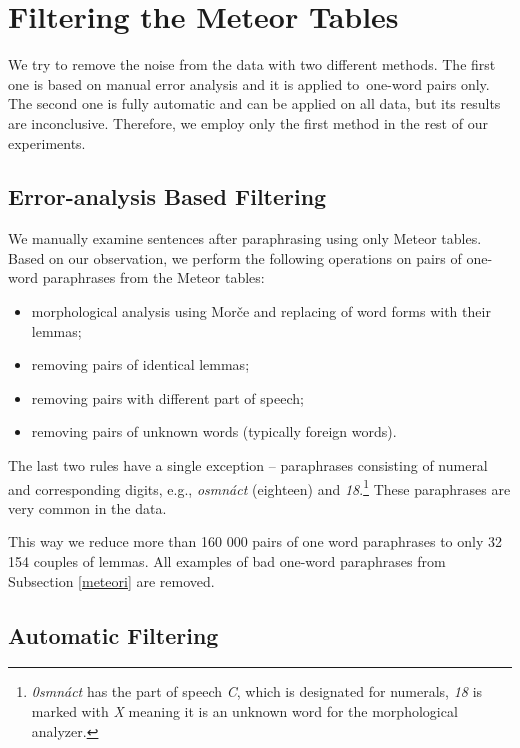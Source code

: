 \section{Filtering the Meteor Tables}
\label{filtering-section}

We try to remove the noise from the data with two different methods. The first
one is based on manual error analysis and it is applied to~one-word pairs only.
The second one is fully automatic and can be applied on all data, but its results are inconclusive.
Therefore, we employ only the first method in the rest of our experiments.

\subsection{Error-analysis Based Filtering}

We manually examine sentences after paraphrasing using only Meteor tables. Based on
our observation, we perform the following operations on pairs of one-word paraphrases 
from the Meteor tables:

\begin{itemize}
\item morphological analysis using Morče \citep{morce:2007} and replacing of word forms with their lemmas; 
\item removing pairs of identical lemmas;
\item removing pairs with different part of speech;
\item removing pairs of unknown words (typically foreign words).
\end{itemize}

The last two rules have a single exception -- paraphrases consisting of numeral and 
corresponding digits, e.g., \textit{osmnáct} (eighteen) and \textit{18}.\footnote{
\textit{0smnáct} has the part of speech \textit{C}, which is designated for numerals, 
\textit{18} is marked with \textit{X} meaning it is an unknown word for the morphological
analyzer.}
These paraphrases are very common in the data. 

This way we reduce more than 160 000 pairs of one word paraphrases to only 32 154
couples of lemmas. All examples of bad one-word paraphrases from Subsection \ref{meteori} 
are removed.

\subsection{Automatic Filtering}


